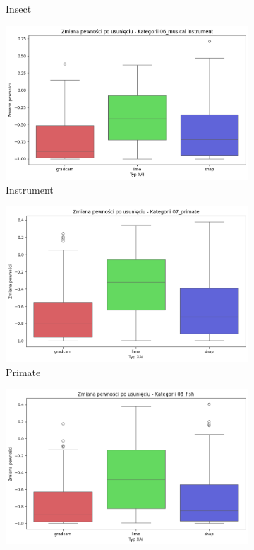 \begin{figure}[h]
\begin{subfigure}[b]{0.3\textwidth}
		\caption{Insect}  \label{rys:base_confidence_no_exp_insect}
	\end{subfigure}
	\begin{subfigure}[b]{0.3\textwidth}
		\centering\includegraphics[width=.9\textwidth]{img/base_confidence_no_exp_music}
		\caption{Instrument}  \label{rys:base_confidence_no_exp_music}
	\end{subfigure}
	\begin{subfigure}[b]{0.3\textwidth}
		\centering\includegraphics[width=.9\textwidth]{img/base_confidence_no_exp_primate}
		\caption{Primate}  \label{rys:base_confidence_no_exp_primate}
	\end{subfigure}
	\begin{subfigure}[b]{0.3\textwidth}
		\centering\includegraphics[width=.9\textwidth]{img/base_confidence_no_exp_fish}

\end{subfigure}
\end{figure}
